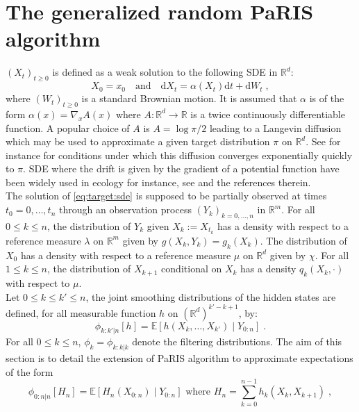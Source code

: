 \documentclass[12pt,draft]{article}
\newcommand{\rmd}{\mathrm{d}}
\newcommand{\eqsp}{\;}
\newcommand{\1}{\mathrm{1}}
\newcommand{\qk}{q_{k}}
\begin{document}
\section{The generalized random PaRIS algorithm}
\label{sec:rwparis}
$(X_t)_{t\ge 0}$ is defined as a weak solution to the following SDE in $\mathbb{R}^d$:
\begin{equation}
\label{eq:target:sde}
X_0 = x_0\quad\mbox{and}\quad \rmd X_t = \alpha(X_t)\rmd t + \rmd W_t\eqsp,
\end{equation}
where $(W_t)_{t\ge 0}$ is a standard Brownian motion. It is assumed that $\alpha$ is of the form $\alpha(x) = \nabla_x A(x)$ where $A: \mathbb{R}^d \to \mathbb{R}$ is a twice continuously differentiable function. 
A popular choice of $A$  is $A = \log \pi/2$ leading to a Langevin diffusion which may be used to approximate a given target distribution $\pi$ on $\mathbb{R}^d$. See for instance \cite{roberts:tweedie:1996} for conditions under which this diffusion converges exponentially quickly to $\pi$. 
SDE where the drift is given by the gradient of a potential function have been widely used in ecology for instance, see \cite{brillinger:et:al:2011,harris:blackwell:2013,preisler:et:al:2013} and the references therein.\\
The solution of \eqref{eq:target:sde} is supposed to be partially observed at times $t_0=0,\dots,t_n$ through an observation process $(Y_k)_{k=0,\dots,n}$ in $\mathbb{R}^m$. 
For all $0\le k \le n$, the distribution of $Y_k$ given $X_k:= X_{t_k}$ has a density with respect to a reference measure $\lambda$ on $\mathbb{R}^m$ given by $g(X_k,Y_k) = g_k(X_k)$. 
The distribution of $X_0$ has a density with respect to a reference measure $\mu$ on $\mathbb{R}^d$ given by $\chi$.
For all $1\le k \le n$, the distribution of $X_{k+1} $ conditional on $X_{k}$ has a density $\qk(X_{k},\cdot)$ with respect to $\mu$.\\ 
Let $0 \leq k \leq k' \leq n$, the joint smoothing distributions of the hidden states are defined, for all measurable function $h$ on $(\mathbb{R}^d)^{k'-k + 1}$, by:
\[
\phi_{k:k'|n}[h] = \mathbb{E}\left[h(X_k,\ldots,X_{k'})\middle|Y_{0:n}\right]\eqsp.
\]
For all $0\le k\le n$, $\phi_{k} = \phi_{k:k|k}$ denote the filtering distributions. The aim of this section is to detail the extension of PaRIS algorithm to approximate expectations of the form
\begin{equation}
\label{def:addfunc}
\phi_{0:n\vert n}[H_{n}] = \mathbb{E}\left[H_n(X_{0:n})\middle|Y_{0:n}\right] \text{ where } H_n=\sum_{k=0}^{n-1}h_k(X_k,X_{k+1})\eqsp,
\end{equation}
\end{document}
